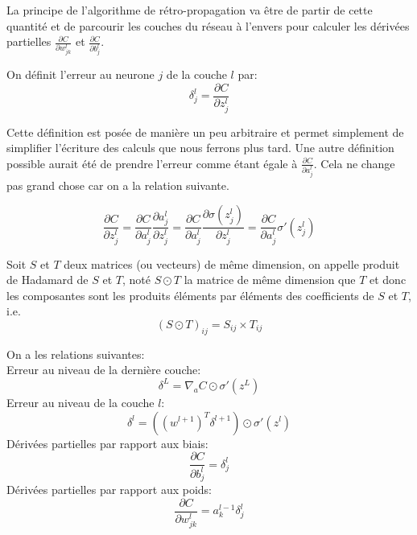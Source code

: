 La principe de l'algorithme de rétro-propagation va être de partir de cette 
quantité et de parcourir les couches du réseau à l'envers pour calculer les 
dérivées partielles $\frac{\partial C}{\partial w_{jk}^{l}}$ et $\frac{\partial C}{\partial b_{j}^{l}}$.

\begin{definition}
On définit l'erreur au neurone $j$ de la couche $l$ par:
\[
\delta_{j}^{l} = \frac{\partial C}{\partial z_{j}^{l}}
\]
\end{definition}

Cette définition est posée de manière un peu arbitraire et permet simplement 
de simplifier l'écriture des calculs que nous ferrons plus tard. 
Une autre définition possible aurait été de prendre l'erreur comme étant égale 
à $\frac{\partial C}{\partial a_{j}^{l}}$. Cela ne change pas grand chose car on 
a la relation suivante.

\[
\frac{\partial C}{\partial z_{j}^{l}} = \frac{\partial C}{\partial a_{j}^{l}} \frac{\partial a_{j}^{l}}{\partial z_{j}^{l}}
= \frac{\partial C}{\partial a_{j}^{l}} \frac{\partial \sigma(z_{j}^{l})}{\partial z_{j}^{l}} = \frac{\partial C}{\partial a_{j}^{l}} \sigma'(z_{j}^{l})
\]


\begin{definition}
Soit $S$ et $T$ deux matrices (ou vecteurs) de même dimension, on appelle 
produit de Hadamard de $S$ et $T$, noté $S \odot T$ la matrice de même dimension 
que $T$ et donc les composantes sont les produits éléments par éléments des 
coefficients de $S$ et $T$, i.e.\/
\[
(S \odot T)_{ij} = S_{ij} \times T_{ij}
\]
\end{definition}



\begin{proposition}
On a les relations suivantes: \\
Erreur au niveau de la dernière couche: 
\begin{equation}
  \label{eq:bp1}
\delta^{L} = \nabla_{a} C \odot \sigma'(z^{L})
\end{equation}
Erreur au niveau de la couche $l$:
\begin{equation}
  \label{eq:bp2}
\delta^{l} = ((w^{l+1})^T \delta^{l+1}) \odot \sigma'(z^{l})
\end{equation}
Dérivées partielles par rapport aux biais:
\begin{equation}
  \label{eq:bp3}
\frac{\partial C}{\partial b_{j}^{l}} = \delta_{j}^{l}
\end{equation}
Dérivées partielles par rapport aux poids:
\begin{equation}
  \label{eq:bp4}
\frac{\partial C}{\partial w_{jk}^{l}} = a_{k}^{l-1} \delta_{j}^{l}
\end{equation}
\end{proposition}

